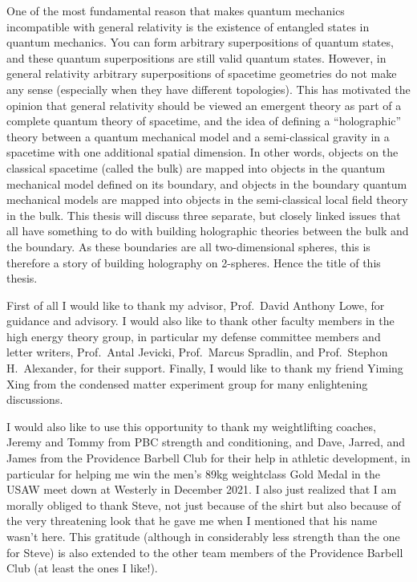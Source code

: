 \documentclass{brownthesis}
\begin{document}
One of the most fundamental reason that makes quantum mechanics incompatible with general relativity is the existence of entangled states in quantum mechanics. You can form arbitrary superpositions of quantum states, and these quantum superpositions are still valid quantum states. However, in general relativity arbitrary superpositions of spacetime geometries do not make any sense (especially when they have different topologies). This has motivated the opinion that general relativity should be viewed an emergent theory as part of a complete quantum theory of spacetime, and the idea of defining a ``holographic'' theory between a quantum mechanical model and a semi-classical gravity in a spacetime with one additional spatial dimension. In other words, objects on the classical spacetime (called the bulk) are mapped into objects in the quantum mechanical model defined on its boundary, and objects in the boundary quantum mechanical models are mapped into objects in the semi-classical local field theory in the bulk. This thesis will discuss three separate, but closely linked issues that all have something to do with building holographic theories between the bulk and the boundary. As these boundaries are all two-dimensional spheres, this is therefore a story of building holography on 2-spheres. Hence the title of this thesis.

First of all I would like to thank my advisor, Prof.~David Anthony Lowe, for guidance and advisory. I would also like to thank other faculty members in the high energy theory group, in particular my defense committee members and letter writers, Prof.~Antal Jevicki, Prof.~Marcus Spradlin, and Prof.~Stephon H.~Alexander, for their support. Finally, I would like to thank my friend Yiming Xing from the condensed matter experiment group for many enlightening discussions.

I would also like to use this opportunity to thank my weightlifting coaches, Jeremy and Tommy from PBC strength and conditioning, and Dave, Jarred, and James from the Providence Barbell Club for their help in athletic development, in particular for helping me win the men's 89kg weightclass Gold Medal in the USAW meet down at Westerly in December 2021. I also just realized that I am morally obliged to thank Steve, not just because of the shirt but also because of the very threatening look that he gave me when I mentioned that his name wasn't here. This gratitude (although in considerably less strength than the one for Steve) is also extended to the other team members of the Providence Barbell Club (at least the ones I like!).
\end{document}
